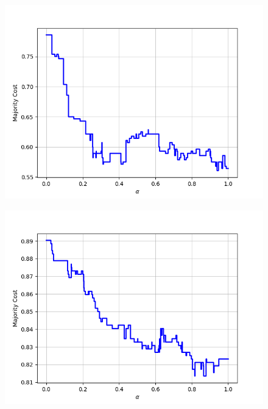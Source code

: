 \begin{figure}[h]
\begin{minipage}{.19\textwidth}
  {\includegraphics[width=\linewidth]{plots/omniglot-intra-ac/Bengali}}
\end{minipage}
\begin{minipage}{.19\textwidth}
  \centering
  {\includegraphics[width=\linewidth]{plots/omniglot-intra-ac/Blackfoot_(Canadian_Aboriginal_Syllabics)}}
\end{minipage}
\begin{minipage}{.19\textwidth}
  \centering

\end{minipage}
\end{figure}
